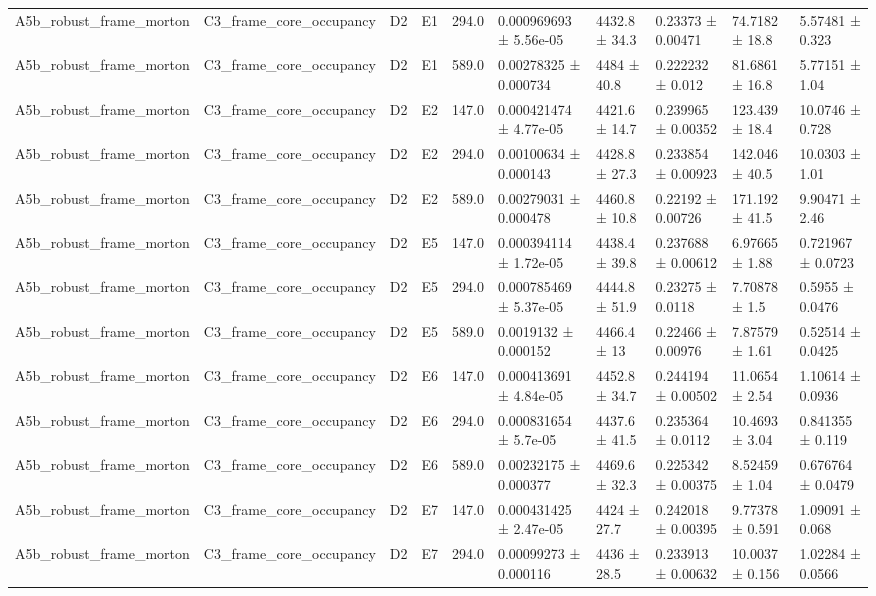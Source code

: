 \begin{table}
\begin{tabular}{llllllllll}
A5b\_robust\_frame\_morton & C3\_frame\_core\_occupancy & D2 & E1 & 294.0 & 0.000969693 ± 5.56e-05 & 4432.8 ± 34.3 & 0.23373 ± 0.00471 & 74.7182 ± 18.8 & 5.57481 ± 0.323 \\
A5b\_robust\_frame\_morton & C3\_frame\_core\_occupancy & D2 & E1 & 589.0 & 0.00278325 ± 0.000734 & 4484 ± 40.8 & 0.222232 ± 0.012 & 81.6861 ± 16.8 & 5.77151 ± 1.04 \\
A5b\_robust\_frame\_morton & C3\_frame\_core\_occupancy & D2 & E2 & 147.0 & 0.000421474 ± 4.77e-05 & 4421.6 ± 14.7 & 0.239965 ± 0.00352 & 123.439 ± 18.4 & 10.0746 ± 0.728 \\
A5b\_robust\_frame\_morton & C3\_frame\_core\_occupancy & D2 & E2 & 294.0 & 0.00100634 ± 0.000143 & 4428.8 ± 27.3 & 0.233854 ± 0.00923 & 142.046 ± 40.5 & 10.0303 ± 1.01 \\
A5b\_robust\_frame\_morton & C3\_frame\_core\_occupancy & D2 & E2 & 589.0 & 0.00279031 ± 0.000478 & 4460.8 ± 10.8 & 0.22192 ± 0.00726 & 171.192 ± 41.5 & 9.90471 ± 2.46 \\
A5b\_robust\_frame\_morton & C3\_frame\_core\_occupancy & D2 & E5 & 147.0 & 0.000394114 ± 1.72e-05 & 4438.4 ± 39.8 & 0.237688 ± 0.00612 & 6.97665 ± 1.88 & 0.721967 ± 0.0723 \\
A5b\_robust\_frame\_morton & C3\_frame\_core\_occupancy & D2 & E5 & 294.0 & 0.000785469 ± 5.37e-05 & 4444.8 ± 51.9 & 0.23275 ± 0.0118 & 7.70878 ± 1.5 & 0.5955 ± 0.0476 \\
A5b\_robust\_frame\_morton & C3\_frame\_core\_occupancy & D2 & E5 & 589.0 & 0.0019132 ± 0.000152 & 4466.4 ± 13 & 0.22466 ± 0.00976 & 7.87579 ± 1.61 & 0.52514 ± 0.0425 \\
A5b\_robust\_frame\_morton & C3\_frame\_core\_occupancy & D2 & E6 & 147.0 & 0.000413691 ± 4.84e-05 & 4452.8 ± 34.7 & 0.244194 ± 0.00502 & 11.0654 ± 2.54 & 1.10614 ± 0.0936 \\
A5b\_robust\_frame\_morton & C3\_frame\_core\_occupancy & D2 & E6 & 294.0 & 0.000831654 ± 5.7e-05 & 4437.6 ± 41.5 & 0.235364 ± 0.0112 & 10.4693 ± 3.04 & 0.841355 ± 0.119 \\
A5b\_robust\_frame\_morton & C3\_frame\_core\_occupancy & D2 & E6 & 589.0 & 0.00232175 ± 0.000377 & 4469.6 ± 32.3 & 0.225342 ± 0.00375 & 8.52459 ± 1.04 & 0.676764 ± 0.0479 \\
A5b\_robust\_frame\_morton & C3\_frame\_core\_occupancy & D2 & E7 & 147.0 & 0.000431425 ± 2.47e-05 & 4424 ± 27.7 & 0.242018 ± 0.00395 & 9.77378 ± 0.591 & 1.09091 ± 0.068 \\
A5b\_robust\_frame\_morton & C3\_frame\_core\_occupancy & D2 & E7 & 294.0 & 0.00099273 ± 0.000116 & 4436 ± 28.5 & 0.233913 ± 0.00632 & 10.0037 ± 0.156 & 1.02284 ± 0.0566 \\

\end{tabular}
\end{table}
